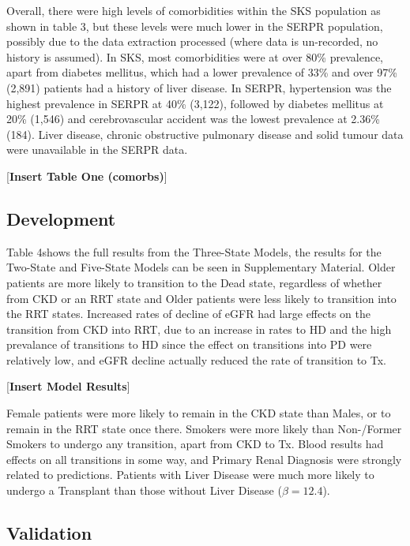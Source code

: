 \documentclass[12pt,twoside]{reedthesis}
\begin{document}
Overall, there were high levels of comorbidities within the SKS population as shown in table 3, but these levels were much lower in the SERPR population, possibly due to the data extraction processed (where data is un-recorded, no history is assumed). In SKS, most comorbidities were at over 80\% prevalence, apart from diabetes mellitus, which had a lower prevalence of 33\% and over 97\% (2,891) patients had a history of liver disease. In SERPR, hypertension was the highest prevalence in SERPR at 40\% (3,122), followed by diabetes mellitus at 20\% (1,546) and cerebrovascular accident was the lowest prevalence at 2.36\% (184). Liver disease, chronic obstructive pulmonary disease and solid tumour data were unavailable in the SERPR data.

{[}\textbf{Insert Table One (comorbs)}{]}

\hypertarget{development-1}{%
\subsection{Development}\label{development-1}}

Table 4shows the full results from the Three-State Models, the results for the Two-State and Five-State Models can be seen in Supplementary Material. Older patients are more likely to transition to the Dead state, regardless of whether from CKD or an RRT state and Older patients were less likely to transition into the RRT states. Increased rates of decline of eGFR had large effects on the transition from CKD into RRT, due to an increase in rates to HD and the high prevalance of transitions to HD since the effect on transitions into PD were relatively low, and eGFR decline actually reduced the rate of transition to Tx.

{[}\textbf{Insert Model Results}{]}

Female patients were more likely to remain in the CKD state than Males, or to remain in the RRT state once there. Smokers were more likely than Non-/Former Smokers to undergo any transition, apart from CKD to Tx. Blood results had effects on all transitions in some way, and Primary Renal Diagnosis were strongly related to predictions. Patients with Liver Disease were much more likely to undergo a Transplant than those without Liver Disease (\(\beta = 12.4\)).

\hypertarget{validation-1}{%
\subsection{Validation}\label{validation-1}}
\end{document}
